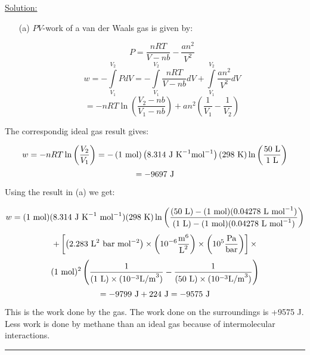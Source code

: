 \noindent
\underline{Solution:}\\

\begin{itemize}

\item[(a)] $PV$-work of a van der Waals gas is given by:

$$P = \frac{nRT}{V - nb} - \frac{an^2}{V^2}$$
$$w = -\int\limits_{V_1}^{V_2}PdV = -\int\limits_{V_1}^{V_2}\frac{nRT}{V - nb}dV + \int\limits_{V_1}^{V_2}\frac{an^2}{V^2}dV$$
$$ = -nRT\ln\left(\frac{V_2 - nb}{V_1 - nb}\right) + an^2\left(\frac{1}{V_1} - \frac{1}{V_2}\right)$$
\end{itemize}

\item[(b)] The correspondig ideal gas result gives:

$$w = -nRT\ln\left(\frac{V_2}{V_1}\right) = -\left(1\textnormal{ mol}\right)\left(8.314\textnormal{ J K}^{-1}\textnormal{mol}^{-1}\right)\left(298\textnormal{ K}\right)\ln\left(\frac{50\textnormal{ L}}{1\textnormal{ L}}\right)$$
$$ = -9697\textnormal{ J}$$

\item[(c)] Using the result in (a) we get:

$$w = (1\textnormal{ mol})(8.314\textnormal{ J K}^{-1}\textnormal{ mol}^{-1})(298\textnormal{ K})\ln\left(\frac{(50\textnormal{ L}) - (1\textnormal{ mol})(0.04278\textnormal{ L mol}^{-1})}{(1\textnormal{ L}) - (1\textnormal{ mol})(0.04278\textnormal{ L mol}^{-1})}\right)$$
$$ + \left[\left(2.283\textnormal{ L}^2\textnormal{ bar mol}^{-2}\right)\times\left(10^{-6}\frac{\textnormal{m}^6}{\textnormal{L}^2}\right)\times\left(10^5\frac{\textnormal{Pa}}{\textnormal{bar}}\right)\right]\times$$
$$(1\textnormal{ mol})^2\left(\frac{1}{(1\textnormal{ L})\times(10^{-3}\textnormal{L/m}^3)} - \frac{1}{(50\textnormal{ L})\times(10^{-3}\textnormal{L/m}^3)}\right)$$
$$ = -9799\textnormal{ J} + 224\textnormal{ J} = -9575\textnormal{ J}$$

This is the work done by the gas. The work done on the surroundings is +9575 J. Less work is done by methane than an ideal gas because of intermolecular interactions.

\hrule\vspace{0.5cm}
